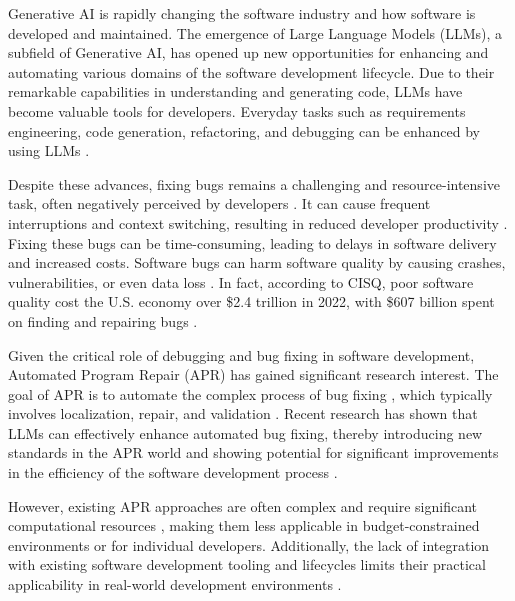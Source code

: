 Generative AI is rapidly changing the software industry and how software is developed and maintained. The emergence of Large Language Models (LLMs), a subfield of Generative AI, has opened up new opportunities for enhancing and automating various domains of the software development lifecycle. Due to their remarkable capabilities in understanding and generating code, LLMs have become valuable tools for developers. Everyday tasks such as requirements engineering, code generation, refactoring, and debugging can be enhanced by using LLMs \cite{houLargeLanguageModels2024, puvvadiCodingAgentsComprehensive2025}.

Despite these advances, fixing bugs remains a challenging and resource-intensive task, often negatively perceived by developers \cite{winterHowDevelopersReally2023}. It can cause frequent interruptions and context switching, resulting in reduced developer productivity \cite{vasilescuSkyNotLimit2016}. Fixing these bugs can be time-consuming, leading to delays in software delivery and increased costs. %
Software bugs can harm software quality by causing crashes, vulnerabilities, or even data loss \cite{tihanyiNewEraSoftware2024}. In fact, according to CISQ, poor software quality cost the U.S. economy over \$2.4 trillion in 2022, with \$607 billion spent on finding and repairing bugs \cite{CostPoorSoftware}.

Given the critical role of debugging and bug fixing in software development, Automated Program Repair (APR) has gained significant research interest. The goal of APR is to automate the complex process of bug fixing \cite{houLargeLanguageModels2024}, which typically involves localization, repair, and validation \cite{zhangEmpiricalStudyFactors2012, leeUnifiedDebuggingApproach2024, xiaAgentlessDemystifyingLLMbased2024, zhangPATCHEmpoweringLarge2025, wangEmpiricalResearchUtilizing2025}. Recent research has shown that LLMs can effectively enhance automated bug fixing, thereby introducing new standards in the APR world and showing potential for significant improvements in the efficiency of the software development process \cite{xiaAgentlessDemystifyingLLMbased2024, liuMarsCodeAgentAInative2024, yangSWEagentAgentComputerInterfaces2024, sobaniaAnalysisAutomaticBug2023, xiaAutomatedProgramRepair2024, huCanGPTO1Kill2024}.

However, existing APR approaches are often complex and require significant computational resources \cite{rondonEvaluatingAgentbasedProgram2025}, making them less applicable in budget-constrained environments or for individual developers. Additionally, the lack of integration with existing software development tooling and lifecycles limits their practical applicability in real-world development environments \cite{chenUnveilingPitfallsUnderstanding2025, liuMarsCodeAgentAInative2024}.


